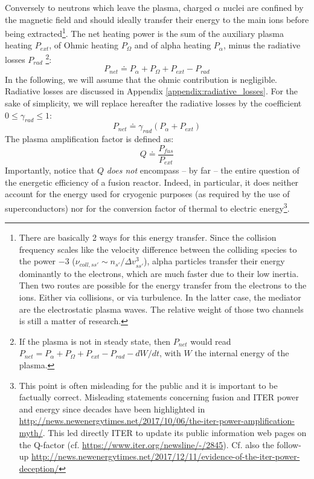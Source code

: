 Conversely to neutrons which leave the plasma, charged $\alpha$ nuclei are confined by the magnetic field and should ideally transfer their energy to the main ions before being extracted\footnote{There are basically 2 ways for this energy transfer. Since the collision frequency scales like the velocity difference between the colliding species to the power $-3$ ($\nu_{coll,ss'}\sim n_{s'}/\Delta v_{ss'}^3$), alpha particles transfer their energy dominantly to the electrons, which are much faster due to their low inertia. Then two routes are possible for the energy transfer from the electrons to the ions. Either via collisions, or via turbulence. In the latter case, the mediator are the electrostatic plasma waves. The relative weight of those two channels is still a matter of research.}. The net heating power is the sum of the auxiliary plasma heating $P_{ext}$, of Ohmic heating $P_\Omega$ and of alpha heating $P_\alpha$, minus the radiative losses $P_{rad}$ \footnote{If the plasma is not in steady state, then $P_{net}$ would read $P_{net} = P_\alpha + P_\Omega + P_{ext} - P_{rad} - dW/dt$, with $W$ the internal energy of the plasma.}:
\begin{equation}
P_{net} \doteq P_\alpha + P_\Omega + P_{ext} - P_{rad}
\label{eq:net_power}
\end{equation}
In the following, we will assume that the ohmic contribution is negligible. Radiative losses are discussed in Appendix \ref{appendix:radiative_losses}. For the sake of simplicity, we will replace hereafter the radiative losses by the coefficient $0\leq \gamma_{rad} \leq1$:
\begin{equation*}
P_{net} \doteq \gamma_{rad} (P_\alpha + P_{ext})
\end{equation*}
The plasma amplification factor is defined as:
\begin{equation}
Q \doteq \frac{P_{fus}}{P_{ext}}
\label{eq:Q}
\end{equation}
Importantly, notice that $Q$ \emph{does not} encompass -- by far -- the entire question of the energetic efficiency of a fusion reactor. Indeed, in particular, it does neither account for the energy used for cryogenic purposes (as required by the use of superconductors) nor for the conversion factor of thermal to electric energy\footnote{This point is often misleading for the public and it is important to be factually correct. Misleading statements concerning fusion and ITER power and energy since decades have been highlighted in \url{http://news.newenergytimes.net/2017/10/06/the-iter-power-amplification-myth/}. This led directly ITER to update its public information web pages on the Q-factor (cf. \url{https://www.iter.org/newsline/-/2845}).  Cf. also the follow-up \url{http://news.newenergytimes.net/2017/12/11/evidence-of-the-iter-power-deception/}}.

